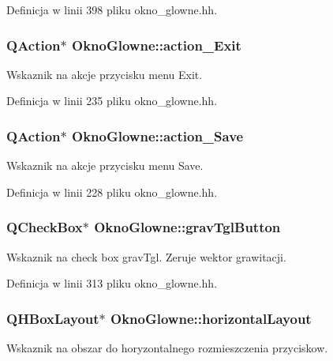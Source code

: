 Definicja w linii 398 pliku okno\-\_\-glowne.\-hh.

\hypertarget{class_okno_glowne_a579ef9901f57057368cb522ea5a9a5c3}{
\subsubsection[{action\-\_\-\-Exit}]{\setlength{\rightskip}{0pt plus 5cm}Q\-Action$\ast$ Okno\-Glowne\-::action\-\_\-\-Exit\hspace{0.3cm}{\ttfamily [private]}}}\label{class_okno_glowne_a579ef9901f57057368cb522ea5a9a5c3}
Wskaznik na akcje przycisku menu Exit. 

Definicja w linii 235 pliku okno\-\_\-glowne.\-hh.

\hypertarget{class_okno_glowne_a2c2d825b6e5e0faa5eb368be4fc73b78}{
\subsubsection[{action\-\_\-\-Save}]{\setlength{\rightskip}{0pt plus 5cm}Q\-Action$\ast$ Okno\-Glowne\-::action\-\_\-\-Save\hspace{0.3cm}{\ttfamily [private]}}}\label{class_okno_glowne_a2c2d825b6e5e0faa5eb368be4fc73b78}
Wskaznik na akcje przycisku menu Save. 

Definicja w linii 228 pliku okno\-\_\-glowne.\-hh.

\hypertarget{class_okno_glowne_ae6e8681e77286aae1f4025ee5ba1ad69}{
\subsubsection[{grav\-Tgl\-Button}]{\setlength{\rightskip}{0pt plus 5cm}Q\-Check\-Box$\ast$ Okno\-Glowne\-::grav\-Tgl\-Button\hspace{0.3cm}{\ttfamily [private]}}}\label{class_okno_glowne_ae6e8681e77286aae1f4025ee5ba1ad69}
Wskaznik na check box grav\-Tgl. Zeruje wektor grawitacji. 

Definicja w linii 313 pliku okno\-\_\-glowne.\-hh.

\hypertarget{class_okno_glowne_aacb5ddb6d0eb560a47917cc1b457239a}{
\subsubsection[{horizontal\-Layout}]{\setlength{\rightskip}{0pt plus 5cm}Q\-H\-Box\-Layout$\ast$ Okno\-Glowne\-::horizontal\-Layout\hspace{0.3cm}{\ttfamily [private]}}}\label{class_okno_glowne_aacb5ddb6d0eb560a47917cc1b457239a}
Wskaznik na obszar do horyzontalnego rozmieszczenia przyciskow. 

